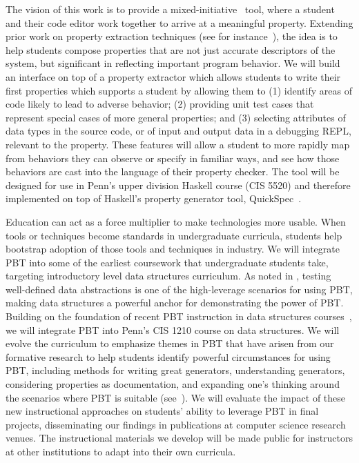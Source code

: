 The vision of this work is to provide a mixed-initiative~\cite{ref:allen1999mixed}
tool, where a student and their code editor work together to arrive at a
meaningful property. Extending prior work on property extraction techniques (see for
instance~\cite{ref:ammons2002mining, ref:le2018deep, ref:claessen2010quickspec,
smith_discovering_2017}), the idea is to help students compose properties that
are not just accurate descriptors of the system, but significant in reflecting
important program behavior. We will build an interface on top of a property
extractor which allows students to write their first properties which supports a
student by allowing them to (1) identify areas of code likely to lead to adverse behavior;
(2) providing unit test cases that represent special cases of more general
properties; and (3) selecting attributes of data types in the source code, or
of input and output data in a debugging REPL, relevant to the property. These
features will allow a student to more rapidly map from behaviors they can
observe or specify in familiar ways, and see how those behaviors are cast into
the language of their property checker.
%
The tool will be designed for use in Penn's upper division Haskell
course (CIS 5520) and therefore implemented on top of
Haskell's property
generator tool, QuickSpec~\cite{ref:claessen2010quickspec}.

%
Education can act as a force multiplier to make technologies more usable.
When tools or techniques become standards in undergraduate curricula,
students help bootstrap adoption of those tools and techniques in industry. We will
integrate PBT into some of the earliest coursework that undergraduate students
take, targeting introductory level data structures
curriculum. As noted in , testing well-defined data
abstractions is one of the high-leverage scenarios for using PBT, making data
structures a powerful anchor for demonstrating the power of PBT. Building on the
foundation of recent PBT instruction in data structures
courses~\cite{wrenn2021using,nelson2021automated}, we will integrate PBT into
Penn's CIS 1210 course on data structures. We
will evolve the curriculum to emphasize themes in PBT that have arisen from our
formative research to help students identify powerful circumstances for
using PBT, including methods for writing great generators, understanding
generators, considering properties as documentation, and expanding one's
thinking around the scenarios where PBT is suitable
(see~). We will evaluate the impact of these new
instructional approaches on students' ability to leverage PBT in final projects,
disseminating our findings in publications at computer science research venues.
The instructional materials we develop will be made public for instructors at
other institutions to adapt into their own curricula.

